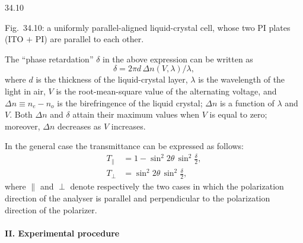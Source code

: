 \begin{figbox}{34.10}
\end{figbox}

Fig.~34.10: a uniformly parallel-aligned liquid-crystal cell, whose two PI plates
(ITO $+$ PI) are parallel to each other.

The ``phase retardation'' $\delta$ in the above expression can be written as
\[
\delta=2\pi d\,\Delta n(V,\lambda)/\lambda ,
\]
where $d$ is the thickness of the liquid-crystal layer, $\lambda$ is the wavelength of the
light in air, $V$ is the root-mean-square value of the alternating voltage, and
$\Delta n\equiv n_e-n_o$ is the birefringence of the liquid crystal; $\Delta n$ is a function
of $\lambda$ and $V$. Both $\Delta n$ and $\delta$ attain their maximum values when $V$ is
equal to zero; moreover, $\Delta n$ decreases as $V$ increases.

In the general case the transmittance can be expressed as follows:
\begin{align*}
T_{\parallel}&=1-\sin^{2}2\theta\,\sin^{2}\frac{\delta}{2},\\[2pt]
T_{\perp}&=\sin^{2}2\theta\,\sin^{2}\frac{\delta}{2},
\end{align*}
where $\parallel$ and $\perp$ denote respectively the two cases in which the polarization
direction of the analyser is parallel and perpendicular to the polarization direction of the
polarizer.

\paragraph{II. Experimental procedure}

